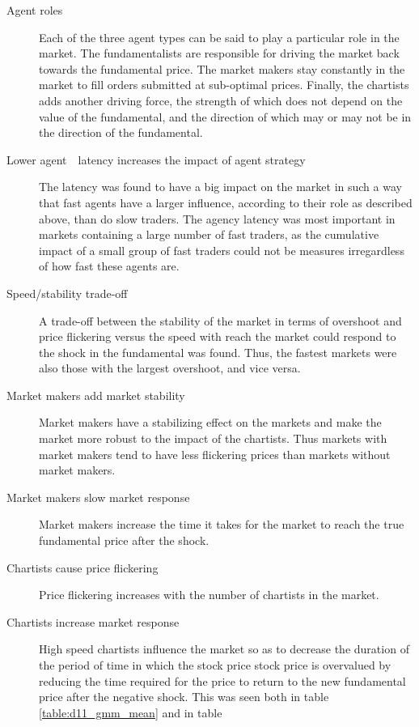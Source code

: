 \begin{description}
\item[Agent roles] Each of the three agent types can be said to play a particular role in the market. The fundamentalists are responsible for driving the market back towards the fundamental price. The market makers stay constantly in the market to fill orders submitted at sub-optimal prices. Finally, the chartists adds another driving force, the strength of which does not depend on the value of the fundamental, and the direction of which may or may not be in the direction of the fundamental.
\item[Lower agent　latency increases the impact of agent strategy] The latency was found to have a big impact on the market in such a way that fast agents have a larger influence, according to their role as described above, than do slow traders. The agency latency was most important in markets containing a large number of fast traders, as the cumulative impact of a small group of fast traders could not be measures irregardless of how fast these agents are.
\item[Speed/stability trade-off] A trade-off between the stability of the market in terms of overshoot and price flickering versus the speed with reach the market could respond to the shock in the fundamental was found. Thus, the fastest markets were also those with the largest overshoot, and vice versa.

\item[Market makers add market stability] Market makers have a stabilizing effect on the markets and make the market more robust to the impact of the chartists. Thus markets with market makers tend to have less flickering prices than markets without market makers. 
\item[Market makers slow market response] Market makers increase the time it takes for the market to reach the true fundamental price after the shock. 

\item[Chartists cause price flickering] Price flickering increases with the number of chartists in the market.

\item[Chartists increase market response] High speed chartists influence the market so as to decrease the duration of the period of time in which the stock price stock price is overvalued by reducing the time required for the price to return to the new fundamental price after the negative shock. This was seen both in table \ref{table:d11_gmm_mean} and in table 


\end{description}
